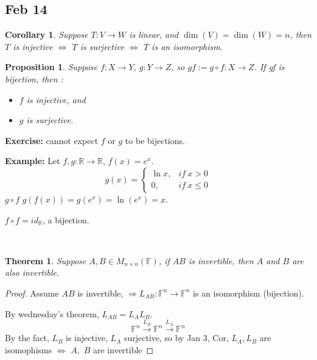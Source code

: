 \documentclass[12pt]{article}
\theoremstyle{plain}
\newtheorem{theorem}{Theorem}[subsection]
\newtheorem{proposition}{Proposition}[subsection]
\newtheorem{corollary}{Corollary}[subsection]
\newcommand{\mR}{{\mathbb{R}}}
\newcommand{\mF}{{\mathbb{F}}}
\begin{document}
	\newpage
	\subsection{Feb 14} 
	\begin{corollary}
		Suppose $T : V \to W$ is linear, and $\dim(V) = \dim(W) = n$, then
		$T$ is injective $\Leftrightarrow$ $T$ is surjective $\Leftrightarrow$
		$T$ is an isomorphism.\\
	\end{corollary}
	
	\begin{proposition}
		Suppose $f : X \to Y$, $g : Y \to Z$, so $gf := g \circ f : X \to Z$.
		If gf is bijection, then : 
		\begin{itemize}
			\item $f$ is injective, and 
			\item $g$ is surjective. \\
		\end{itemize}	
	\end{proposition}

	\textbf{Exercise: }cannot expect $f$ or $g$ to be bijections. \\

	{\color{Brown}
	\textbf{Example: }Let $f,g : \mR \to \mR$, $f(x) = e^x$. 
	\[
		g(x) = 
		\begin{cases}
			\ln x, &if \ x > 0\\
			0,	& if \ x \leq 0
		\end{cases}
	\]
	$g\circ f$ $g(f(x)) = g(e^x) = \ln(e^x) = x$. 

	$f\circ f = id_{\mR}$, a bijection. }\\
	
	\begin{theorem}
		Suppose $A, B \in M_{n \times n} (\mF)$, if $AB$ is invertible, then
		$A$ and $B$ are also invertible. 
	\end{theorem}
	\begin{proof}
		Assume $AB$ is invertible, 
		$\Rightarrow L_{AB}: \mF^n \to \mF^n$ is an isomorphism (bijection). 

		By wednesday's theorem, $L_{AB} = L_A L_B$. 
		\[
			\mF^n \overset{L_B}{\to} \mF^n \overset{L_A}{\to}\mF^n
		\]
		By the fact, $L_B$ is injective, $L_A$ surjective, so by Jan 3, Cor, 
		$L_A, L_B $ are isomophisms $\Leftrightarrow$ $A,$ $B$ are invertible 
	\end{proof}
\end{document}
